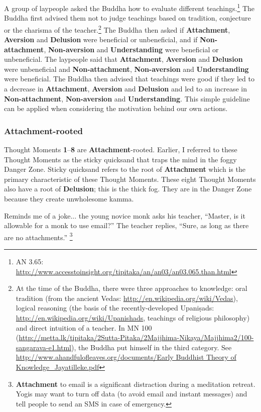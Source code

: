 A group of laypeople asked the Buddha how to evaluate different teachings.\footnote{AN 3.65: \url{http://www.accesstoinsight.org/tipitaka/an/an03/an03.065.than.html}} The Buddha first advised them not to judge teachings based on tradition, conjecture or the charisma of the teacher.\footnote{At the time of the Buddha, there were three approaches to knowledge: oral tradition (from the ancient Vedas: \url{http://en.wikipedia.org/wiki/Vedas}), logical reasoning (the basis of the recently-developed Upaniṣads: \url{http://en.wikipedia.org/wiki/Upanishads}, teachings of religious philosophy) and direct intuition of a teacher. In MN 100 (\url{http://metta.lk/tipitaka/2Sutta-Pitaka/2Majjhima-Nikaya/Majjhima2/100-sangarava-e1.html}), the Buddha put himself in the third category. See \url{http://www.ahandfulofleaves.org/documents/Early Buddhist Theory of Knowledge_Jayatilleke.pdf}} The Buddha then asked if \textbf{Attachment}, \textbf{Aversion} and \textbf{Delusion} were beneficial or unbeneficial, and if \textbf{Non-attachment}, \textbf{Non-aversion} and \textbf{Understanding} were beneficial or unbeneficial. The laypeople said that \textbf{Attachment}, \textbf{Aversion} and \textbf{Delusion} were unbeneficial and \textbf{Non-attachment}, \textbf{Non-aversion} and \textbf{Understanding} were beneficial. The Buddha then advised that teachings were good if they led to a decrease in \textbf{Attachment}, \textbf{Aversion} and \textbf{Delusion} and led to an increase in \textbf{Non-attachment}, \textbf{Non-aversion} and \textbf{Understanding}. This simple guideline can be applied when considering the motivation behind our own actions.

\subsubsection*{\textbf{Attachment}-rooted}

Thought Moments \textbf{1}--\textbf{8} are \textbf{Attachment}-rooted. Earlier, I referred to these Thought Moments as the sticky quicksand that traps the mind in the foggy Danger Zone. Sticky quicksand refers to the root of \textbf{Attachment} which is the primary characteristic of these Thought Moments. These eight Thought Moments also have a root of \textbf{Delusion}; this is the thick fog. They are in the Danger Zone because they create unwholesome kamma.

Reminds me of a joke... the young novice monk asks his teacher, “Master, is it allowable for a monk to use email?” The teacher replies, “Sure, as long as there are no attachments.” \footnote{\textbf{Attachment} to email is a significant distraction during a meditation retreat. Yogis may want to turn off data (to avoid email and instant messages) and tell people to send an SMS in case of emergency.}

